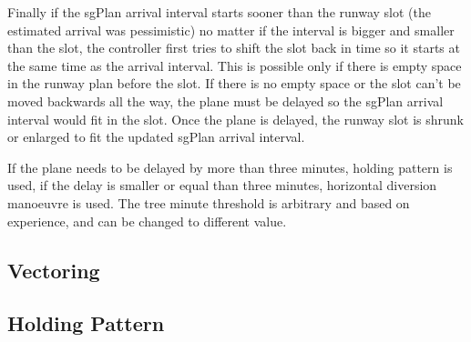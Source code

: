 Finally if the sgPlan arrival interval starts sooner than the runway slot (the estimated arrival was pessimistic) no matter if the interval is bigger and smaller than the slot, the controller first tries to shift the slot back in time so it starts at the same time as the arrival interval. This is possible only if there is empty space in the runway plan before the slot. If there is no empty space or the slot can't be moved backwards all the way, the plane must be delayed so the sgPlan arrival interval would fit in the slot. Once the plane is delayed, the runway slot is shrunk or enlarged to fit the updated sgPlan arrival interval.

If the plane needs to be delayed by more than three minutes, holding pattern is used, if the delay is smaller or equal than three minutes, horizontal diversion manoeuvre is used. The tree minute threshold is arbitrary and based on experience, and can be changed to different value. 

\subsection{Vectoring}
\subsection{Holding Pattern}


